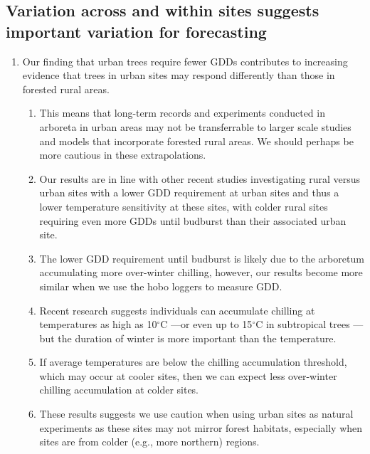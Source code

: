 \documentclass{article}\usepackage[]{graphicx}\usepackage[]{color}
\begin{document}
\subsection*{Variation across and within sites suggests important variation for forecasting} 
  \begin{enumerate} 
\item Our finding that urban trees require fewer GDDs contributes to increasing evidence that trees in urban sites may respond differently than those in forested rural areas.
  \begin{enumerate} 
  \item This means that long-term records and experiments conducted in arboreta in urban areas may not be transferrable to larger scale studies and models that incorporate forested rural areas. We should perhaps be more cautious in these extrapolations. 
  \item Our results are in line with other recent studies investigating rural versus urban sites with a lower GDD requirement at urban sites and thus a lower temperature sensitivity \citep{Meng2020} at these sites, with colder rural sites requiring even more GDDs until budburst than their associated urban site.
  \item The lower GDD requirement until budburst is likely due to the arboretum accumulating more over-winter chilling, however, our results become more similar when we use the hobo loggers to measure GDD. 
  \item Recent research suggests individuals can accumulate chilling at temperatures as high as 10$^{\circ}$C \citep{Baumgarten2021}---or even up to 15$^{\circ}$C in subtropical trees \citep{Zhang2021}---but the duration of winter is more important than the temperature. 
  \item If average temperatures are below the chilling accumulation threshold, which may occur at cooler sites, then we can expect less over-winter chilling accumulation at colder sites.
  \item These results suggests we use caution when using urban sites as natural experiments as these sites may not mirror forest habitats, especially when sites are from colder (e.g., more northern) regions.
  \end{enumerate}
  

\end{enumerate}
\end{document}
